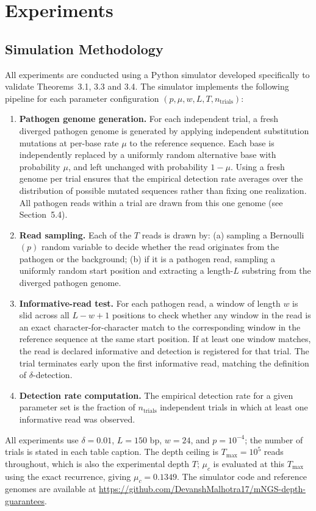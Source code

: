 \documentclass[12pt]{article}
\theoremstyle{definition}
\theoremstyle{plain}
\begin{document}
\section{Experiments}

\subsection{Simulation Methodology}

All experiments are conducted using a Python simulator developed specifically
to validate Theorems~3.1, 3.3 and 3.4. The simulator implements the following pipeline
for each parameter configuration $(p,\mu,w,L,T,n_{\text{trials}})$:
\begin{enumerate}
  \item \textbf{Pathogen genome generation.} For each independent trial, a
  fresh diverged pathogen genome is generated by applying independent
  substitution mutations at per-base rate $\mu$ to the reference sequence.
  Each base is independently replaced by a uniformly random alternative base
  with probability $\mu$, and left unchanged with probability $1-\mu$. Using
  a fresh genome per trial ensures that the empirical detection rate
  averages over the distribution of possible mutated sequences rather than
  fixing one realization. All pathogen reads within a trial are drawn from
  this one genome (see Section~5.4).

  \item \textbf{Read sampling.} Each of the $T$ reads is drawn by: (a)
  sampling a Bernoulli$(p)$ random variable to decide whether the read
  originates from the pathogen or the background; (b) if it is a pathogen
  read, sampling a uniformly random start position and extracting a
  length-$L$ substring from the diverged pathogen genome.

  \item \textbf{Informative-read test.} For each pathogen read, a window of
  length $w$ is slid across all $L-w+1$ positions to check whether any
  window in the read is an exact character-for-character match to the
  corresponding window in the reference sequence at the same start position.
  If at least one window matches, the read is declared informative and
  detection is registered for that trial. The trial terminates early upon
  the first informative read, matching the definition of $\delta$-detection.

  \item \textbf{Detection rate computation.} The empirical detection rate
  for a given parameter set is the fraction of $n_{\text{trials}}$
  independent trials in which at least one informative read was observed.
\end{enumerate}
All experiments use $\delta=0.01$, $L=150$ bp, $w=24$, and $p=10^{-4}$; the
number of trials is stated in each table caption. The depth ceiling is
$T_{\max}=10^5$ reads throughout, which is also the experimental depth $T$;
$\mu_c$ is evaluated at this $T_{\max}$ using the exact recurrence, giving
$\mu_c=0.1349$. The simulator code and reference genomes are available at
\url{https://github.com/DevanshMalhotra17/mNGS-depth-guarantees}.
\end{document}
